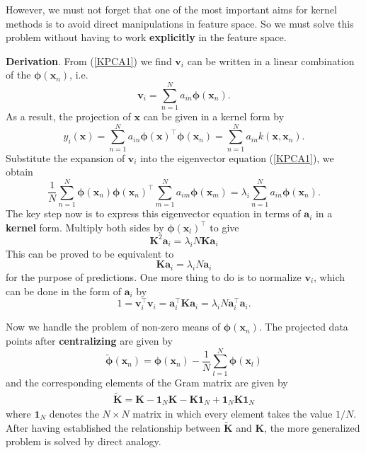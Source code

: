 \documentclass[a4paper]{report}
\renewcommand{\bf}{\mathbf}
\newcommand{\bs}{\boldsymbol}
\begin{document}
However, we must not forget that one of the most important aims for kernel methods is to avoid direct manipulations in feature space. So we must solve this problem without having to work \textbf{explicitly} in the feature space.

\textbf{Derivation}.  From (\ref{KPCA1}) we find $\bf{v}_i$ can be written in a linear combination of the $\bs{\phi}(\bf{x}_n)$, i.e.
\begin{equation}
	\bf{v}_i = \sum_{n=1}^N a_{in}\bs{\phi}(\bf{x}_n).
\end{equation}
As a result, the projection of $\bf{x}$ can be given in a kernel form by
\begin{equation}
	y_i(\bf{x}) = \sum_{n=1}^N a_{in}\bs{\phi}(\bf{x})^{\intercal} \bs{\phi}(\bf{x}_n) = \sum_{n=1}^N a_{in} k(\bf{x},\bf{x}_n).
\end{equation}
Substitute the expansion of $\bf{v}_i$ into the eigenvector equation (\ref{KPCA1}), we obtain
\begin{equation}
	\frac{1}{N} \sum_{n=1}^N \bs{\phi}(\bf{x}_n)\bs{\phi}(\bf{x}_n)^{\intercal} \sum_{m=1}^N a_{im} \bs{\phi}(\bf{x}_m)=\lambda_i\sum_{n=1}^N a_{in}\bs{\phi}(\bf{x}_n).
\end{equation}
The key step now is to express this eigenvector equation in terms of $\bf{a}_i$ in a \textbf{kernel} form. Multiply both sides by $\bs{\phi}(\bf{x}_l)^{\intercal}$ to give
\begin{equation}
	\bf{K}^2 \bf{a}_i = \lambda_i N \bf{Ka}_i
\end{equation}
This can be proved to be equivalent to
\begin{equation}
	\bf{Ka}_i = \lambda_i N \bf{a}_i
\end{equation}
for the purpose of predictions. One more thing to do is to normalize $\bf{v}_i$, which can be done in the form of $\bf{a}_i$ by
\begin{equation}
	1 = \bf{v}_i^{\intercal} \bf{v}_i = \bf{a}_i^{\intercal} \bf{Ka}_i = \lambda_i N \bf{a}_i^{\intercal}\bf{a}_i.
\end{equation}

Now we handle the problem of non-zero means of $\bs{\phi}(\bf{x}_n)$. The projected data points after \textbf{centralizing} are given by
\begin{equation}
	\tilde{\bs{\phi}}(\bf{x}_n) = \bs{\phi}(\bf{x}_n) - \frac{1}{N} \sum_{l=1}^N \bs{\phi}(\bf{x}_l)
\end{equation}
and the corresponding elements of the Gram matrix are given by
\begin{align}
	\tilde{\bf{K}} = \bf{K} - \bf{1}_N\bf{K} - \bf{K} \bf{1}_N + \bf{1}_N \bf{K} \bf{1}_N
\end{align}
where $\bf{1}_N$ denotes the $N \times N$ matrix in which every element takes the value $1/N$. After having established the relationship between $\tilde{\bf{K}}$ and $\bf{K}$, the more generalized problem is solved by direct analogy.
\end{document}
